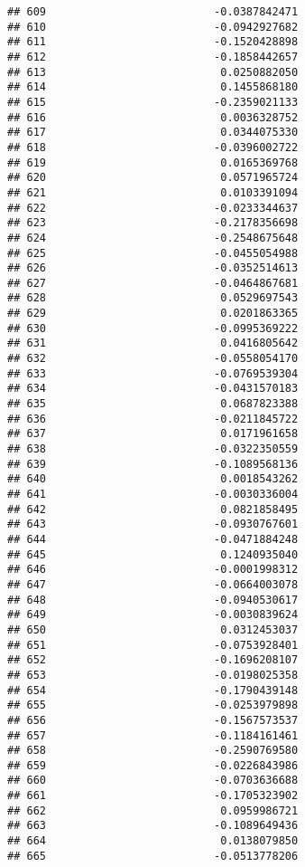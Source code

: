 \documentclass[
]{article}
\begin{document}
\begin{verbatim}
## 609                          -0.0387842471
## 610                          -0.0942927682
## 611                          -0.1520428898
## 612                          -0.1858442657
## 613                           0.0250882050
## 614                           0.1455868180
## 615                          -0.2359021133
## 616                           0.0036328752
## 617                           0.0344075330
## 618                          -0.0396002722
## 619                           0.0165369768
## 620                           0.0571965724
## 621                           0.0103391094
## 622                          -0.0233344637
## 623                          -0.2178356698
## 624                          -0.2548675648
## 625                          -0.0455054988
## 626                          -0.0352514613
## 627                          -0.0464867681
## 628                           0.0529697543
## 629                           0.0201863365
## 630                          -0.0995369222
## 631                           0.0416805642
## 632                          -0.0558054170
## 633                          -0.0769539304
## 634                          -0.0431570183
## 635                           0.0687823388
## 636                          -0.0211845722
## 637                           0.0171961658
## 638                          -0.0322350559
## 639                          -0.1089568136
## 640                           0.0018543262
## 641                          -0.0030336004
## 642                           0.0821858495
## 643                          -0.0930767601
## 644                          -0.0471884248
## 645                           0.1240935040
## 646                          -0.0001998312
## 647                          -0.0664003078
## 648                          -0.0940530617
## 649                          -0.0030839624
## 650                           0.0312453037
## 651                          -0.0753928401
## 652                          -0.1696208107
## 653                          -0.0198025358
## 654                          -0.1790439148
## 655                          -0.0253979898
## 656                          -0.1567573537
## 657                          -0.1184161461
## 658                          -0.2590769580
## 659                          -0.0226843986
## 660                          -0.0703636688
## 661                          -0.1705323902
## 662                           0.0959986721
## 663                          -0.1089649436
## 664                           0.0138079850
## 665                          -0.0513778206

\end{verbatim}
\end{document}
